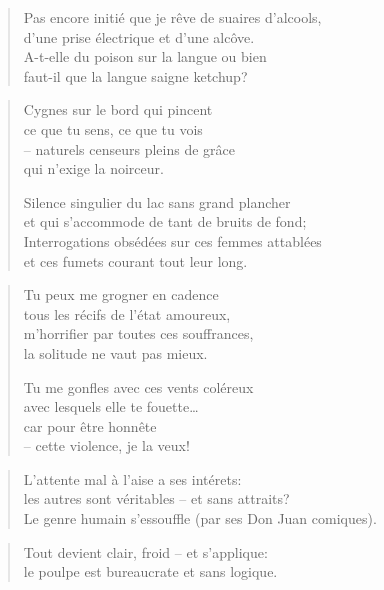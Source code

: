   \begin{verse}
    Pas encore initié que je rêve de suaires d’alcools,\\
    d’une prise électrique et d’une alcôve.\\
    A-t-elle du poison sur la langue ou bien\\
    faut-il que la langue saigne ketchup?
  \end{verse}
  \begin{verse}
    Cygnes sur le bord qui pincent\\
    ce que tu sens, ce que tu vois\\
    -- naturels censeurs pleins de grâce\\
    qui n’exige la noirceur.

    Silence singulier du lac sans grand plancher\\
    et qui s’accommode de tant de bruits de fond;\\
    Interrogations obsédées sur ces femmes attablées\\
    et ces fumets courant tout leur long.
  \end{verse}
\newpage
{}
  \begin{verse}
    Tu peux me grogner en cadence\\
    tous les récifs de l’état amoureux,\\
    m’horrifier par toutes ces souffrances,\\
    la solitude ne vaut pas mieux.

    Tu me gonfles avec ces vents coléreux\\
    avec lesquels elle te fouette…\\
    car pour être honnête\\
    -- cette violence, je la veux!
  \end{verse}
  \begin{verse}
    L’attente mal à l’aise a ses intérets:\\
    les autres sont véritables -- et sans attraits?\\
    Le genre humain s’essouffle (par ses Don Juan comiques).
  \end{verse}
  \begin{verse}
    Tout devient clair, froid -- et s’applique:\\
    le poulpe est bureaucrate et sans logique.
  \end{verse}
